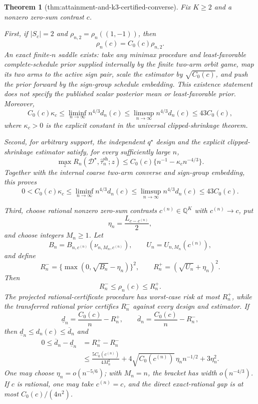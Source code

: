 \documentclass{article}
\newtheorem{theorem}{Theorem}
\begin{document}
\begin{theorem}[thm:attainment-and-k3-certified-converse]\label{thm:attainment-and-k3-certified-converse}
Fix \(K\geq2\) and a nonzero zero-sum contrast \(c\).

First, if \(|S_c|=2\) and \(\rho_{n,2}=\rho_n((1,-1))\), then
\[
 \rho_n(c)=C_0(c)\rho_{n,2}.
\]
An exact finite-\(n\) saddle exists: take any minimax procedure and least-favorable complete-schedule prior supplied internally by the finite two-arm orbit game, map its two arms to the active sign pair, scale the estimator by \(\sqrt{C_0(c)}\), and push the prior forward by the sign-group schedule embedding. This existence statement does not specify the published scalar posterior mean or least-favorable prior. Moreover,
\[
 C_0(c)\kappa_c
 \leq\liminf_{n\to\infty}n^{4/3}d_n(c)
 \leq\limsup_{n\to\infty}n^{4/3}d_n(c)
 \leq43C_0(c),
\]
where \(\kappa_c>0\) is the explicit constant in the universal clipped-shrinkage theorem.

Second, for arbitrary support, the independent \(q^\star\) design and the explicit clipped-shrinkage estimator satisfy, for every sufficiently large \(n\),
\[
 \max_zR_n(\mathcal D^\star,\widehat\tau_n^{\mathrm{sh}};z)
 \leq C_0(c)\{n^{-1}-\kappa_cn^{-4/3}\}.
\]
Together with the internal coarse two-arm converse and sign-group embedding, this proves
\[
 0<C_0(c)\kappa_c
 \leq\liminf_{n\to\infty}n^{4/3}d_n(c)
 \leq\limsup_{n\to\infty}n^{4/3}d_n(c)
 \leq43C_0(c).
\]

Third, choose rational nonzero zero-sum contrasts \(c^{(n)}\in\mathbb Q^K\) with \(c^{(n)}\to c\), put
\[
 \eta_n=\frac{L_{c-c^{(n)}}}{2},
\]
and choose integers \(M_n\geq1\). Let
\[
 B_n=B_{n,c^{(n)}}(\nu_{n,M_n,c^{(n)}}),
 \qquad U_n=U_{n,M_n}(c^{(n)}),
\]
and define
\[
 R_n^-=\{\max(0,\sqrt{B_n}-\eta_n)\}^2,
 \qquad R_n^+=(\sqrt{U_n}+\eta_n)^2.
\]
Then
\[
 R_n^-\leq\rho_n(c)\leq R_n^+.
\]
The projected rational-certificate procedure has worst-case risk at most \(R_n^+\), while the transferred rational prior certifies \(R_n^-\) against every design and estimator. If
\[
 \underline d_n=\frac{C_0(c)}n-R_n^+,
 \qquad \overline d_n=\frac{C_0(c)}n-R_n^-,
\]
then \(\underline d_n\leq d_n(c)\leq\overline d_n\) and
\[
 \begin{aligned}
 0\leq\overline d_n-\underline d_n
 &=R_n^+-R_n^-\\
 &\leq\frac{5C_0(c^{(n)})}{4M_n^2}
 +4\sqrt{C_0(c^{(n)})}\,\eta_nn^{-1/2}
 +3\eta_n^2.
 \end{aligned}
\]
One may choose \(\eta_n=o(n^{-5/6})\); with \(M_n=n\), the bracket has width \(o(n^{-4/3})\). If \(c\) is rational, one may take \(c^{(n)}=c\), and the direct exact-rational gap is at most \(C_0(c)/(4n^2)\).


\end{theorem}
\end{document}

